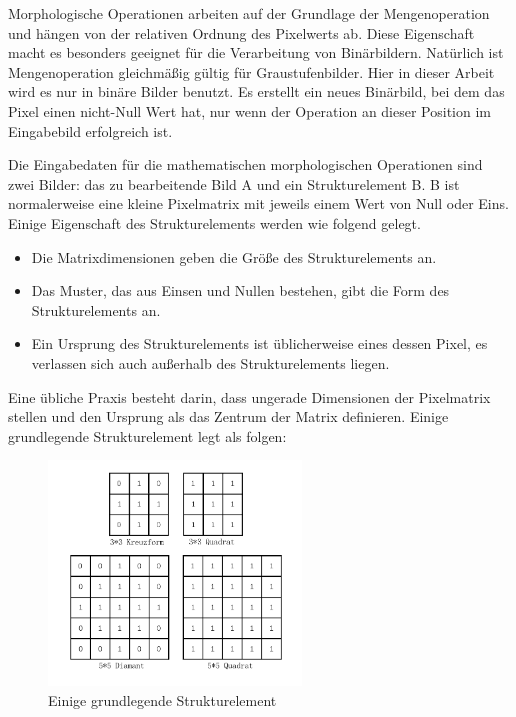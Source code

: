 Morphologische Operationen arbeiten auf der Grundlage der Mengenoperation und hängen von der relativen Ordnung des Pixelwerts ab. Diese Eigenschaft macht es besonders geeignet für die Verarbeitung von Binärbildern. Natürlich ist Mengenoperation gleichmäßig gültig für Graustufenbilder. Hier in dieser Arbeit wird es nur in binäre Bilder benutzt. Es erstellt ein neues Binärbild, bei dem das Pixel einen nicht-Null Wert hat, nur wenn der Operation an dieser Position im Eingabebild erfolgreich ist.

Die Eingabedaten für die mathematischen morphologischen Operationen sind zwei Bilder: das zu bearbeitende Bild A und ein Strukturelement B. B ist normalerweise eine kleine Pixelmatrix mit jeweils einem Wert von Null oder Eins. Einige Eigenschaft des Strukturelements werden wie folgend gelegt.

\begin{itemize}

\item Die Matrixdimensionen geben die Größe des Strukturelements an.
\item Das Muster, das aus Einsen und Nullen bestehen, gibt die Form des Strukturelements an.
\item Ein Ursprung des Strukturelements ist üblicherweise eines dessen Pixel, es verlassen sich auch außerhalb des Strukturelements liegen. 

\end{itemize}

Eine übliche Praxis besteht darin, dass ungerade Dimensionen der Pixelmatrix stellen und den Ursprung als das Zentrum der Matrix definieren. Einige grundlegende Strukturelement legt als folgen:

\begin{figure}[htb]
 \centering 
  \includegraphics[keepaspectratio,width=0.6\textwidth]{images/4_ZweiteErfahrung/Morphological/strelement.pdf}
 \caption{Einige grundlegende Strukturelement}
 \label{fig:Strukturelement}
\end{figure} 

